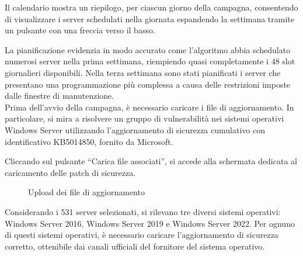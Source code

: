 Il calendario mostra un riepilogo, per ciascun giorno della campagna, 
consentendo di visualizzare i server schedulati nella giornata espandendo la 
settimana tramite un pulsante con una freccia verso il basso.

La pianificazione evidenzia in modo accurato come l'algoritmo abbia schedulato 
numerosi server nella prima settimana, riempiendo quasi completamente i 48 slot 
giornalieri disponibili. Nella terza settimana sono stati pianificati i server 
che presentano una programmazione più complessa a causa delle restrizioni imposte 
dalle finestre di manutenzione.\\

Prima dell'avvio della campagna, è necessario caricare i file di aggiornamento. 
In particolare, si mira a risolvere un gruppo di vulnerabilità nei sistemi 
operativi Windows Server utilizzando l'aggiornamento di sicurezza cumulativo 
con identificativo KB5014850, fornito da Microsoft.

Cliccando sul pulsante “Carica file associati”, si accede alla schermata dedicata 
al caricamento delle patch di sicurezza.

\begin{figure}[H]
\begin{flushright}
    \centering
    \caption{Upload dei file di aggiornamento}
    \label{fig:Upload dei file di aggiornamento}
\end{flushright}
\end{figure}

Considerando i 531 server selezionati, si rilevano tre diversi sistemi operativi: 
Windows Server 2016, Windows Server 2019 e Windows Server 2022. Per ognuno di 
questi sistemi operativi, è necessario caricare l'aggiornamento di sicurezza 
corretto, ottenibile dai canali ufficiali del fornitore del sistema operativo.

